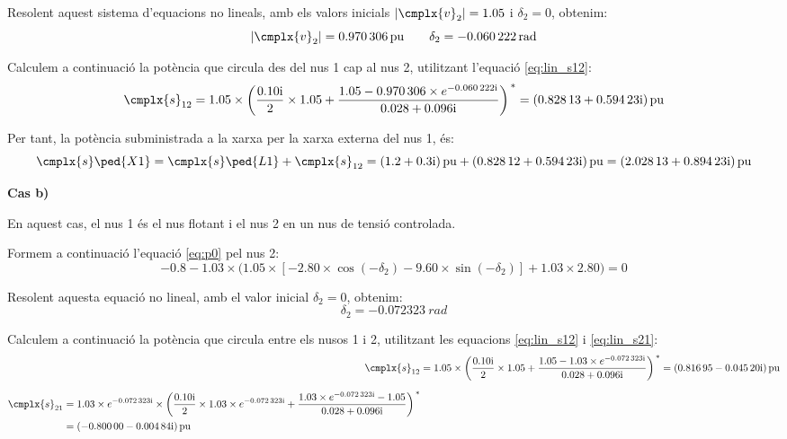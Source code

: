 \begin{exemple}
    Resolent aquest sistema d'equacions no lineals, amb els valors inicials $|\cmplx{v}_2|=\num{1,05}$ i $\delta_2=0$, obtenim:
    \[ 
    	|\cmplx{v}_2|=\qty{0,970306}{pu} \qquad \delta_2=\qty{-0,060222}{rad} 
    \]

    Calculem a continuació la potència que circula des del nus 1 cap al
    nus 2, utilitzant l'equació \eqref{eq:lin_s12}:
    \[
    \cmplx{s}_{12} = \num{1,05}\times \left( \frac{\complexnum{j0,10}}{2} \times \num{1,05} + \frac{ \num{1,05} -
    \num{0,970306}\times e^{\complexnum{-j0,060222}}} {\complexnum{0,028+j0,096}} \right)^{\,*} = \complexqty{0,82813 + j0,59423}{pu}
    \]

    Per tant, la potència subministrada a la xarxa per la xarxa externa del nus
    1, és:
    \[
    \cmplx{s}\ped{X1} = \cmplx{s}\ped{L1} + \cmplx{s}_{12} = \complexqty{1,2+j0,3}{pu} + \complexqty{0,82812 + j 0,59423}{pu} = \complexqty{2,02813 + j 0,89423}{pu}
    \]

    \textbf{Cas b)}

    En aquest cas, el nus 1 és el nus flotant i el nus 2 en un nus
    de tensió controlada.

    Formem a continuació l'equació \eqref{eq:p0} pel nus 2:
    \[
    \num{-0,8} - \num{1,03}\times \bigl( \num{1,05}\times [\num{-2,80}\times\cos(-\delta_2) - \num{9,60}\times\sin(
    -\delta_2)] + \num{1,03}\times \num{2,80} \bigr) = 0
    \]

    Resolent aquesta equació no lineal, amb el valor inicial $\delta_2=0$, obtenim:
    \[
        \delta_2= \qty{-0,072323}{rad}
    \]

    Calculem a continuació la potència que circula entre els nusos 1 i
    2, utilitzant les equacions \eqref{eq:lin_s12} i \eqref{eq:lin_s21}:
    \begin{align*}
    \cmplx{s}_{12} &= \num{1,05} \times\left( \frac{\complexnum{j0,10}}{2} \times \num{1,05} + \frac{ \num{1,05} -
    \num{1,03}\times e^{\complexnum{-j0,072323}}}{\complexnum{0,028+j0,096}} \right)^{\,*} =
    \complexqty{0,81695 - j 0,04520}{pu} \\[1.5ex]
    \begin{split}
    \cmplx{s}_{21} &= \num{1,03}\times e^{\complexnum{-j0,072323}} \times\left( \frac{\complexnum{j0,10}}{2}\times
    \num{1,03}\times e^{\complexnum{-j0,072323}} + \frac{ \num{1,03}\times e^{\complexnum{-j0,072323}} -\num{1,05}}
    {\complexnum{0,028+j0,096}} \right)^{\,*} \\
    &= \complexqty{-0,80000 - j 0,00484}{pu}
    \end{split}
    \end{align*}


\end{exemple}
